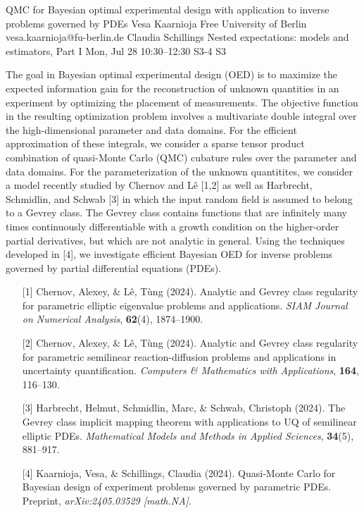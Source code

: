 \begin{talk}
  {QMC for Bayesian optimal experimental design with application to inverse problems governed by PDEs}%
  {Vesa Kaarnioja}%
  {Free University of Berlin}%
  {vesa.kaarnioja@fu-berlin.de}%
  {Claudia Schillings}%
  {Nested expectations: models and estimators, Part I}%
  {Mon, Jul 28 10:30–12:30}%
  {S3-4}%
  {S3}%
				
			
The goal in Bayesian optimal experimental design (OED) is to maximize the expected information gain for the reconstruction of unknown quantities in an experiment by optimizing the placement of measurements. The objective function in the resulting optimization problem involves a multivariate double integral over the high-dimensional parameter and data domains. For the efficient approximation of these integrals, we consider a sparse tensor product combination of quasi-Monte Carlo (QMC) cubature rules over the parameter and data domains. For the parameterization of the unknown quantitites, we consider a model recently studied by Chernov and L\^{e} [1,2] as well as Harbrecht, Schmidlin, and Schwab [3] in which the input random field is assumed to belong to a Gevrey class. The Gevrey class contains functions that are infinitely many times continuously differentiable with a growth condition on the higher-order partial derivatives, but which are not analytic in general. Using the techniques developed in [4], we investigate efficient Bayesian OED for inverse problems governed by partial differential equations (PDEs).
\begin{enumerate}
	\item[{[1]}] Chernov, Alexey, \& L\^{e}, T\`{u}ng (2024). Analytic and Gevrey class regularity for parametric elliptic eigenvalue problems and applications. \emph{SIAM Journal on Numerical Analysis}, \textbf{62}(4), 1874--1900.
	\item[{[2]}] Chernov, Alexey, \& L\^{e}, T\`{u}ng (2024). Analytic and Gevrey class regularity for parametric semilinear reaction-diffusion problems and applications in uncertainty quantification. \emph{Computers \& Mathematics with Applications}, \textbf{164}, 116--130.
	\item[{[3]}] Harbrecht, Helmut, Schmidlin, Marc, \& Schwab, Christoph (2024). The Gevrey class implicit mapping theorem with applications to UQ of semilinear elliptic PDEs. \emph{Mathematical Models and Methods in Applied Sciences}, \textbf{34}(5), 881--917.
	\item[{[4]}] Kaarnioja, Vesa, \& Schillings, Claudia (2024). Quasi-Monte Carlo for Bayesian design of experiment problems governed by parametric PDEs. Preprint, \emph{arXiv:2405.03529 [math.NA]}.
\end{enumerate}

\end{talk}

